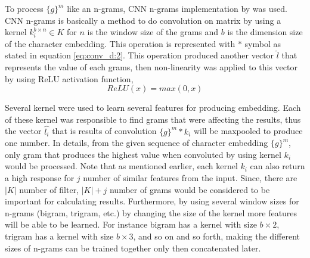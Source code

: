         To process $\{g\}^m$ like an n-grams, CNN n-grams
        implementation by \cite{convolutional2014kim} was used. CNN
        n-grams is basically a method to do convolution on matrix by
        using a kernel $k_i^{b \times n} \in K$ for $n$ is the window
        size of the grams and $b$ is the dimension size of the
        character embedding. This operation is represented with $*$
        symbol as stated in equation \ref{eq:conv_d:2}. This operation
        produced another vector $\hat{l}$ that represents the value of
        each grams, then non-linearity was applied to this vector by
        using ReLU activation function,
        \begin{equation}
            \label{eq:relu}
            ReLU(x) = max(0,x)
        \end{equation}

        Several kernel were used to learn several features for
        producing embedding. Each of these kernel was responsible to
        find grams that were affecting the results, thus the vector
        $\hat{l_i}$ that is results of convolution $\{g\}^m * k_i$
        will be maxpooled to produce one number. In details, from the
        given sequence of character embedding $\{g\}^m$, only gram
        that produces the highest value when convoluted by using
        kernel $k_i$ would be processed. Note that as mentioned
        earlier, each kernel $k_i$ can also return a high response for
        $j$ number of similar features from the input. Since, there
        are $\vert K \vert$ number of filter, $\vert K \vert + j$
        number of grams would be considered to be important for
        calculating results. Furthermore, by using several window
        sizes for n-grams (bigram, trigram, etc.) by changing the size
        of the kernel more features will be able to be learned. For
        instance bigram has a kernel with size $b \times 2$, trigram
        has a kernel with size $b \times 3$, and so on and so forth,
        making the different sizes of n-grams can be trained together
        only then concatenated later.

